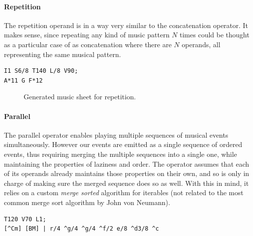 \documentclass[a4paper,UKenglish,cleveref, autoref]{oasics-v2019}
\begin{document}
\paragraph*{Repetition}
The repetition operand is in a way very similar to the concatenation operator. It makes sense, since repeating any kind of music pattern $N$ times could be thought as a particular case of as concatenation where there are $N$ operands, all representing the same musical pattern.

\begin{lstlisting}[caption={Intro to Westworld's Theme by Ramin Djawadi},label=list:8-6,captionpos=t,abovecaptionskip=-\medskipamount]
I1 S6/8 T140 L/8 V90;
A*11 G F*12
\end{lstlisting}

\begin{figure}[h]
  \centering
  {%
  \setlength{\fboxsep}{0pt}%
  \setlength{\fboxrule}{0pt}%
  }%
  \caption{Generated music sheet for repetition.}
  \label{fig:repetition}
\end{figure}

\paragraph*{Parallel}
The parallel operator enables playing multiple sequences of musical events simultaneously. However our events are emitted as a single sequence of ordered events, thus requiring merging the multiple sequences into a single one, while maintaining the properties of laziness and order. The operator assumes that each of its operands already maintains those properties on their own, and so is only in charge of making sure the merged sequence does so as well. With this in mind, it relies on a custom \textit{merge sorted} algorithm for iterables (not related to the most common merge sort algorithm by John von Neumann).

\begin{lstlisting}[caption={Snippet of Soft to Be Strong by Marina},label=list:8-6,captionpos=t,abovecaptionskip=-\medskipamount]
T120 V70 L1;
[^Cm] [BM] | r/4 ^g/4 ^g/4 ^f/2 e/8 ^d3/8 ^c
\end{lstlisting}
\end{document}
